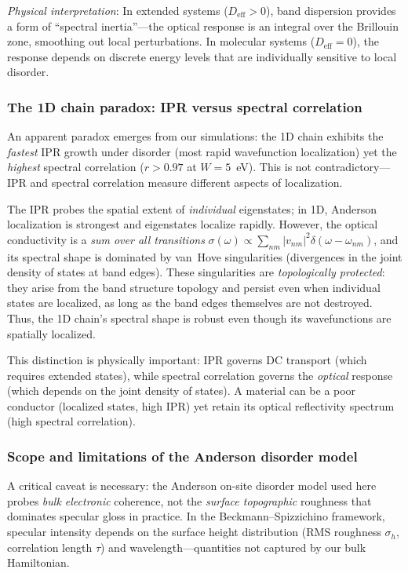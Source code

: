 \documentclass[twocolumn,showpacs,preprintnumbers,amsmath,amssymb,prb]{revtex4-2}
\begin{document}
\emph{Physical interpretation}: In extended systems ($D_\mathrm{eff} > 0$),
band dispersion provides a form of ``spectral inertia''---the optical
response is an integral over the Brillouin zone, smoothing out local
perturbations. In molecular systems ($D_\mathrm{eff} = 0$), the
response depends on discrete energy levels that are individually
sensitive to local disorder.

\subsubsection{The 1D chain paradox: IPR versus spectral correlation}

An apparent paradox emerges from our simulations: the 1D chain
exhibits the \emph{fastest} IPR growth under disorder (most rapid
wavefunction localization) yet the \emph{highest} spectral correlation
($r > 0.97$ at $W = 5$~eV). This is not contradictory---IPR and
spectral correlation measure different aspects of localization.

The IPR probes the spatial extent of \emph{individual} eigenstates;
in 1D, Anderson localization is strongest and eigenstates localize
rapidly. However, the optical conductivity is a \emph{sum over all
transitions} $\sigma(\omega) \propto \sum_{nm} |v_{nm}|^2
\delta(\omega - \omega_{nm})$, and its spectral shape is dominated by
van~Hove singularities (divergences in the joint density of states at
band edges). These singularities are \emph{topologically protected}:
they arise from the band structure topology and persist even when
individual states are localized, as long as the band edges
themselves are not destroyed. Thus, the 1D chain's spectral shape is
robust even though its wavefunctions are spatially localized.

This distinction is physically important: IPR governs DC transport
(which requires extended states), while spectral correlation governs
the \emph{optical} response (which depends on the joint density of
states). A material can be a poor conductor (localized states,
high IPR) yet retain its optical reflectivity spectrum (high spectral
correlation).

\subsubsection{Scope and limitations of the Anderson disorder model}

A critical caveat is necessary: the Anderson on-site disorder model
used here probes \emph{bulk electronic} coherence, not the
\emph{surface topographic} roughness that dominates specular gloss
in practice. In the Beckmann--Spizzichino framework, specular
intensity depends on the surface height distribution (RMS roughness
$\sigma_h$, correlation length $\tau$) and wavelength---quantities
not captured by our bulk Hamiltonian.
\end{document}
